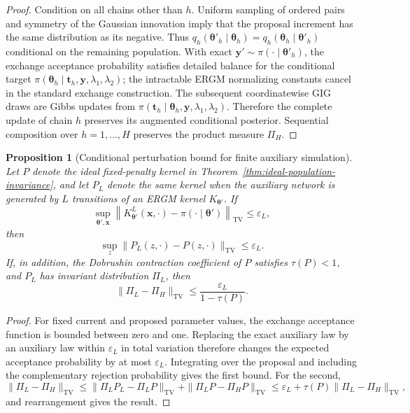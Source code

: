 \documentclass[preprint,12pt,authoryear]{elsarticle}
\newtheorem{proposition}{Proposition}
\def\bs{\boldsymbol}
\def\th{\boldsymbol{\theta}}
\begin{document}
\begin{proof}
Condition on all chains other than \(h\). Uniform sampling of ordered pairs and
symmetry of the Gaussian innovation imply that the proposal increment has the
same distribution as its negative. Thus
\(q_h(\th'_h\mid\th_h)=q_h(\th_h\mid\th'_h)\) conditional on the remaining
population. With exact \(\bs y'\sim\pi(\cdot\mid\th'_h)\), the exchange
acceptance probability satisfies detailed balance for the conditional target
\(\pi(\th_h\mid\bs t_h,\bs y,\lambda_1,\lambda_2)\); the intractable ERGM
normalizing constants cancel in the standard exchange construction. The
subsequent coordinatewise GIG draws are Gibbs updates from
\(\pi(\bs t_h\mid\th_h,\bs y,\lambda_1,\lambda_2)\). Therefore the complete
update of chain \(h\) preserves its augmented conditional posterior. Sequential
composition over \(h=1,\ldots,H\) preserves the product measure \(\Pi_H\).
\end{proof}

\begin{proposition}[Conditional perturbation bound for finite auxiliary simulation]
\label{prop:auxiliary-perturbation}
Let \(P\) denote the ideal fixed-penalty kernel in
Theorem~\ref{thm:ideal-population-invariance}, and let \(P_L\) denote the same
kernel when the auxiliary network is generated by \(L\) transitions of an ERGM
kernel \(K_{\th'}\). If
\[
\sup_{\th',\bs x}
\left\|K_{\th'}^L(\bs x,\cdot)-\pi(\cdot\mid\th')\right\|_{\mathrm{TV}}
\le \varepsilon_L,
\]
then
\[
\sup_{z}\|P_L(z,\cdot)-P(z,\cdot)\|_{\mathrm{TV}}
\le \varepsilon_L.
\]
If, in addition, the Dobrushin contraction coefficient of \(P\) satisfies
\(\tau(P)<1\), and \(P_L\) has invariant distribution \(\Pi_L\), then
\[
\|\Pi_L-\Pi_H\|_{\mathrm{TV}}
\le
\frac{\varepsilon_L}{1-\tau(P)}.
\]
\end{proposition}

\begin{proof}
For fixed current and proposed parameter values, the exchange acceptance
function is bounded between zero and one. Replacing the exact auxiliary law by
an auxiliary law within \(\varepsilon_L\) in total variation therefore changes
the expected acceptance probability by at most \(\varepsilon_L\). Integrating
over the proposal and including the complementary rejection probability gives
the first bound. For the second,
\[
\|\Pi_L-\Pi_H\|_{\mathrm{TV}}
\le
\|\Pi_LP_L-\Pi_LP\|_{\mathrm{TV}}
+
\|\Pi_LP-\Pi_HP\|_{\mathrm{TV}}
\le
\varepsilon_L+\tau(P)\|\Pi_L-\Pi_H\|_{\mathrm{TV}},
\]
and rearrangement gives the result.
\end{proof}
\end{document}
